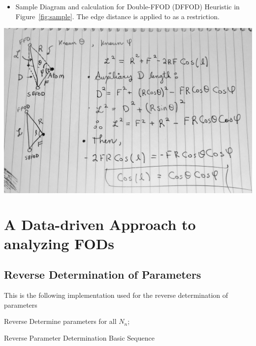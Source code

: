 \documentclass[12pt,a4paper,]{report}
\let\origfigure=\figure
\let\endorigfigure=\endfigure
\renewenvironment{figure}[1][]{%
\origfigure[H]
}{%
\endorigfigure
}
\providecommand{\tightlist}{%
  \setlength{\itemsep}{0pt}\setlength{\parskip}{0pt}}
\begin{document}
\begin{itemize}
\tightlist
\item
  Sample Diagram and calculation for Double-FFOD (DFFOD) Heuristic in
  Figure~\ref{fig:sample}. The edge distance is applied to as a
  restriction.
\end{itemize}

\begin{figure}
\hypertarget{fig:sample}{%
\centering
\includegraphics{source/figures/sample.jpg}
\caption{draft DFFOD}\label{fig:sample}
}
\end{figure}

\section{A Data-driven Approach to analyzing
FODs}\label{a-data-driven-approach-to-analyzing-fods}

\subsection{Reverse Determination of
Parameters}\label{reverse-determination-of-parameters}

This is the following implementation used for the reverse determination
of parameters

\begin{algorithm}[H]
  Reverse Determine parameters for all $N_n$;
 \caption{Reverse Parameter Determination Basic Sequence}
\end{algorithm}
\end{document}
